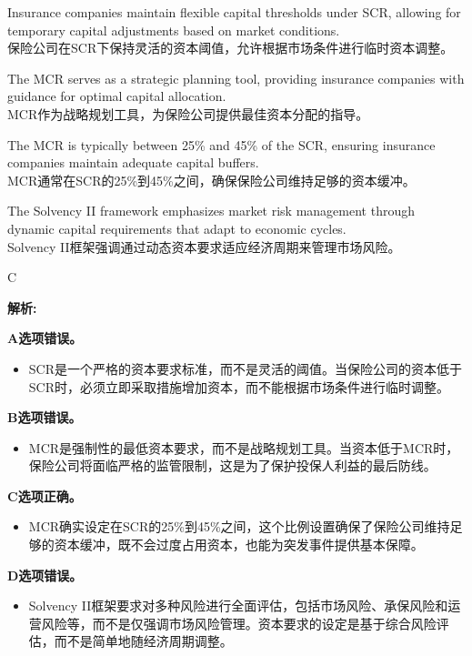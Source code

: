 \documentclass{article}
\newenvironment{explanation}
{\textbf{解析:}\par}
{\par}
\begin{document}
\begin{choices}
    \item Insurance companies maintain flexible capital thresholds under SCR, allowing for temporary capital adjustments based on market conditions.\\
    保险公司在SCR下保持灵活的资本阈值，允许根据市场条件进行临时资本调整。
    \item The MCR serves as a strategic planning tool, providing insurance companies with guidance for optimal capital allocation.\\
    MCR作为战略规划工具，为保险公司提供最佳资本分配的指导。
    \item The MCR is typically between 25\% and 45\% of the SCR, ensuring insurance companies maintain adequate capital buffers.\\
    MCR通常在SCR的25\%到45\%之间，确保保险公司维持足够的资本缓冲。
    \item The Solvency II framework emphasizes market risk management through dynamic capital requirements that adapt to economic cycles.\\
    Solvency II框架强调通过动态资本要求适应经济周期来管理市场风险。
\end{choices}

\begin{correctanswer}
    C
\end{correctanswer}

\begin{explanation}
    \textbf{A选项错误。}
    \begin{itemize}
        \item SCR是一个严格的资本要求标准，而不是灵活的阈值。当保险公司的资本低于SCR时，必须立即采取措施增加资本，而不能根据市场条件进行临时调整。
    \end{itemize}

    \textbf{B选项错误。}
    \begin{itemize}
        \item MCR是强制性的最低资本要求，而不是战略规划工具。当资本低于MCR时，保险公司将面临严格的监管限制，这是为了保护投保人利益的最后防线。
    \end{itemize}

    \textbf{C选项正确。}
    \begin{itemize}
        \item MCR确实设定在SCR的25\%到45\%之间，这个比例设置确保了保险公司维持足够的资本缓冲，既不会过度占用资本，也能为突发事件提供基本保障。
    \end{itemize}

    \textbf{D选项错误。}
    \begin{itemize}
        \item Solvency II框架要求对多种风险进行全面评估，包括市场风险、承保风险和运营风险等，而不是仅强调市场风险管理。资本要求的设定是基于综合风险评估，而不是简单地随经济周期调整。
    \end{itemize}
\end{explanation}
\end{document}
